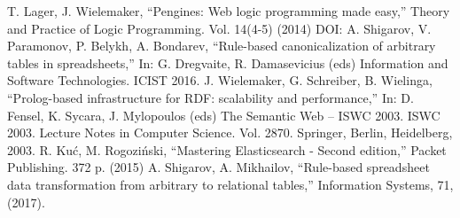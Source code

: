 \documentclass[conference,a4paper]{IEEEtran}
\begin{document}
\begin{thebibliography}{99}
  T. Lager, J. Wielemaker, ``Pengines: Web logic programming made easy,''
  Theory and Practice of Logic Programming. Vol. 14(4-5) (2014)
DOI: 
A. Shigarov, V. Paramonov, P. Belykh, A. Bondarev, ``Rule-based canonicalization of arbitrary tables in spreadsheets,'' In: G. Dregvaite, R. Damasevicius (eds) Information and Software Technologies. ICIST 2016.
  J. Wielemaker, G. Schreiber, B. Wielinga, ``Prolog-based infrastructure
  for RDF: scalability and performance,'' In: D. Fensel, K. Sycara,
  J. Mylopoulos (eds) The Semantic Web -- ISWC 2003. ISWC 2003. Lecture
  Notes in Computer Science. Vol. 2870. Springer, Berlin,
  Heidelberg, 2003.
  R. Kuć, M. Rogoziński, ``Mastering Elasticsearch - Second edition,'' Packet
  Publishing. 372 p. (2015)
A. Shigarov, A. Mikhailov, ``Rule-based spreadsheet data transformation from arbitrary to relational tables,'' Information Systems, 71, (2017). 
\end{thebibliography}
\end{document}
